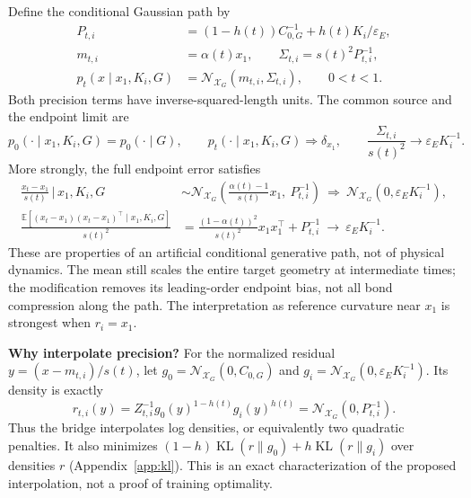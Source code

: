\documentclass[11pt,letterpaper]{article}
\newcommand{\E}{\mathbb E}
\newcommand{\X}{\mathcal X_G}
\newcommand{\epsE}{\varepsilon_E}
\newcommand{\KL}{\operatorname{KL}}
\newcommand{\given}{\,\big|\,}
\begin{document}
Define the conditional Gaussian path by
\begin{equation}\label{eq:path}
\boxed{\begin{aligned}
P_{t,i}&=(1-h(t))C_{0,G}^{-1}+h(t)K_i/\epsE,\\
m_{t,i}&=\alpha(t)x_1,\qquad \Sigma_{t,i}=s(t)^2P_{t,i}^{-1},\\
p_t(x\mid x_1,K_i,G)&=\mathcal N_{\X}(m_{t,i},\Sigma_{t,i}),\qquad 0<t<1.
\end{aligned}}
\end{equation}
Both precision terms have inverse-squared-length units. The common source and the endpoint limit are
\begin{equation}\label{eq:endpoints}
p_0(\cdot\mid x_1,K_i,G)=p_0(\cdot\mid G),\qquad
p_t(\cdot\mid x_1,K_i,G)\Rightarrow\delta_{x_1},\qquad
\frac{\Sigma_{t,i}}{s(t)^2}\longrightarrow\epsE K_i^{-1}.
\end{equation}
More strongly, the full endpoint error satisfies
\begin{equation}\label{eq:fullerror}
\begin{aligned}
\frac{x_t-x_1}{s(t)}\given x_1,K_i,G
&\sim\mathcal N_{\X}\!\left(\frac{\alpha(t)-1}{s(t)}x_1,\ P_{t,i}^{-1}\right)
\ \Rightarrow\ \mathcal N_{\X}(0,\epsE K_i^{-1}),\\
\frac{\E[(x_t-x_1)(x_t-x_1)^\top\mid x_1,K_i,G]}{s(t)^2}
&=\frac{(1-\alpha(t))^2}{s(t)^2}x_1x_1^\top+P_{t,i}^{-1}
\ \longrightarrow\ \epsE K_i^{-1}.
\end{aligned}
\end{equation}
These are properties of an artificial conditional generative path, not of physical dynamics. The mean still scales the entire target geometry at intermediate times; the modification removes its leading-order endpoint bias, not all bond compression along the path. The interpretation as reference curvature near $x_1$ is strongest when $r_i=x_1$.

\textbf{Why interpolate precision?} For the normalized residual $y=(x-m_{t,i})/s(t)$, let $g_0=\mathcal N_{\X}(0,C_{0,G})$ and $g_i=\mathcal N_{\X}(0,\epsE K_i^{-1})$. Its density is exactly
\begin{equation}\label{eq:logbridge}
r_{t,i}(y)=Z_{t,i}^{-1}g_0(y)^{1-h(t)}g_i(y)^{h(t)}
=\mathcal N_{\X}(0,P_{t,i}^{-1}).
\end{equation}
Thus the bridge interpolates log densities, or equivalently two quadratic penalties. It also minimizes $(1-h)\KL(r\|g_0)+h\KL(r\|g_i)$ over densities $r$ (Appendix~\ref{app:kl}). This is an exact characterization of the proposed interpolation, not a proof of training optimality.
\end{document}
